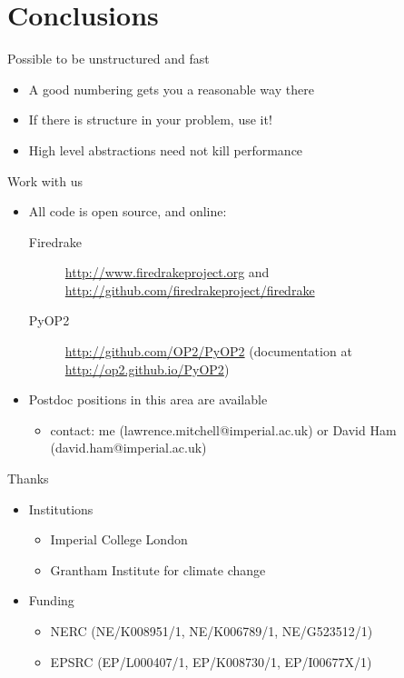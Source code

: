 \documentclass[bigger]{beamer}
\begin{document}
\section{Conclusions}
\label{sec:orgheadline27}

\begin{frame}[label={sec:orgheadline24}]{Possible to be unstructured and fast}
\begin{itemize}
\item A good numbering gets you a reasonable way there
\item If there is structure in your problem, use it!
\item High level abstractions need not kill performance
\end{itemize}
\end{frame}

\begin{frame}[label={sec:orgheadline25}]{Work with us}
\begin{itemize}
\item All code is open source, and online:
\begin{description}
\item[{Firedrake}] \url{http://www.firedrakeproject.org} and
\url{http://github.com/firedrakeproject/firedrake}
\item[{PyOP2}] \url{http://github.com/OP2/PyOP2} (documentation at
\url{http://op2.github.io/PyOP2})
\end{description}
\item Postdoc positions in this area are available
\begin{itemize}
\item contact: me (lawrence.mitchell@imperial.ac.uk) or David Ham
(david.ham@imperial.ac.uk)
\end{itemize}
\end{itemize}
\end{frame}

\begin{frame}[label={sec:orgheadline26}]{Thanks}
\begin{itemize}
\item Institutions
\begin{itemize}
\item Imperial College London
\item Grantham Institute for climate change
\end{itemize}
\item Funding
\begin{itemize}
\item NERC (NE/K008951/1, NE/K006789/1, NE/G523512/1)
\item EPSRC (EP/L000407/1, EP/K008730/1, EP/I00677X/1)
\end{itemize}
\end{itemize}
\end{frame}
\end{document}
